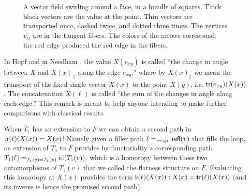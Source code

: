 \begin{figure}[h]
\caption{A vector field swirling around a face, in a bundle of squares. Thick black vectors are the value at the point. Thin vectors are transported once, dashed twice, and dotted three times. The vertices \( v_{ij} \) are in the tangent fibers. The colors of the arrows correspond: the red edge produced the red edge in the fibers.}
\label{fig:swirling}
\end{figure}

\begin{mynote}
In Hopf \cite{hopf} and in Needham \cite{needham}, the value \( X(e_{xy}) \) is called ``the change in angle between \( X \) and \( X(x)_{||} \) along the edge \( e_{xy} \),'' where by \( X(x)_{||} \) we mean the transport of the fixed single vector \( X(x) \) to the point \( X(y) \), i.e. \( \mathsf{tr}(e_{xy})(X(x)) \). The concatenation \( X(\ell) \) is called ``the sum of the changes in angle along each edge.'' This remark is meant to help anyone intending to make further comparisons with classical results.
\end{mynote}


When \( T_1 \) has an extension to \( F \) we can obtain a second path in \( \mathsf{tr}(\ell)(X(x))=X(x) \)! Namely given a filler path \( \ell=_{v=_{\mathbb{M}} v} \mathsf{refl}(v) \) that fills the loop, an extension of \( T_1 \) to \( F \) provides by functoriality a corresponding path \( T_1(\ell)=_{T_1(v)=T_1(v)}\text{id}(T_1(v)) \), which is a homotopy between these two automorphisms of \( T_1(v) \) that we called the flatness structure on \( F \). Evaluating this homotopy at \( X(x) \) provides the term \( \flat(\ell)(X(x)):X(x)=\mathsf{tr}(\ell)(X(x)) \) (and its inverse is hence the promised second path).


